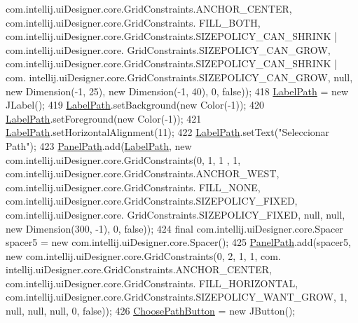 \begin{DoxyCode}
      com.intellij.uiDesigner.core.GridConstraints.ANCHOR\_CENTER, com.intellij.uiDesigner.core.GridConstraints.
      FILL\_BOTH, com.intellij.uiDesigner.core.GridConstraints.SIZEPOLICY\_CAN\_SHRINK | com.intellij.uiDesigner.core.
      GridConstraints.SIZEPOLICY\_CAN\_GROW, com.intellij.uiDesigner.core.GridConstraints.SIZEPOLICY\_CAN\_SHRINK | com.
      intellij.uiDesigner.core.GridConstraints.SIZEPOLICY\_CAN\_GROW, null, \textcolor{keyword}{new} Dimension(-1, 25), \textcolor{keyword}{new} Dimension(-1, 
      40), 0, \textcolor{keyword}{false}));
418         \hyperlink{classpresentacion_1_1form_1_1mainForm_a54f7619a7cbb904b26c32ccaef512573}{LabelPath} = \textcolor{keyword}{new} JLabel();
419         \hyperlink{classpresentacion_1_1form_1_1mainForm_a54f7619a7cbb904b26c32ccaef512573}{LabelPath}.setBackground(\textcolor{keyword}{new} Color(-1));
420         \hyperlink{classpresentacion_1_1form_1_1mainForm_a54f7619a7cbb904b26c32ccaef512573}{LabelPath}.setForeground(\textcolor{keyword}{new} Color(-1));
421         \hyperlink{classpresentacion_1_1form_1_1mainForm_a54f7619a7cbb904b26c32ccaef512573}{LabelPath}.setHorizontalAlignment(11);
422         \hyperlink{classpresentacion_1_1form_1_1mainForm_a54f7619a7cbb904b26c32ccaef512573}{LabelPath}.setText(\textcolor{stringliteral}{"Seleccionar Path"});
423         \hyperlink{classpresentacion_1_1form_1_1mainForm_a0704eebe3c2e55cfd3b9344cca4d2d4b}{PanelPath}.add(\hyperlink{classpresentacion_1_1form_1_1mainForm_a54f7619a7cbb904b26c32ccaef512573}{LabelPath}, \textcolor{keyword}{new} com.intellij.uiDesigner.core.GridConstraints(0, 1, 1
      , 1, com.intellij.uiDesigner.core.GridConstraints.ANCHOR\_WEST, com.intellij.uiDesigner.core.GridConstraints.
      FILL\_NONE, com.intellij.uiDesigner.core.GridConstraints.SIZEPOLICY\_FIXED, com.intellij.uiDesigner.core.
      GridConstraints.SIZEPOLICY\_FIXED, null, null, \textcolor{keyword}{new} Dimension(300, -1), 0, \textcolor{keyword}{false}));
424         \textcolor{keyword}{final} com.intellij.uiDesigner.core.Spacer spacer5 = \textcolor{keyword}{new} com.intellij.uiDesigner.core.Spacer();
425         \hyperlink{classpresentacion_1_1form_1_1mainForm_a0704eebe3c2e55cfd3b9344cca4d2d4b}{PanelPath}.add(spacer5, \textcolor{keyword}{new} com.intellij.uiDesigner.core.GridConstraints(0, 2, 1, 1, com.
      intellij.uiDesigner.core.GridConstraints.ANCHOR\_CENTER, com.intellij.uiDesigner.core.GridConstraints.
      FILL\_HORIZONTAL, com.intellij.uiDesigner.core.GridConstraints.SIZEPOLICY\_WANT\_GROW, 1, null, null, null, 0, \textcolor{keyword}{false}));
426         \hyperlink{classpresentacion_1_1form_1_1mainForm_a0f7073c8a28d814154d208bc924fedb4}{ChoosePathButton} = \textcolor{keyword}{new} JButton();

\end{DoxyCode}
